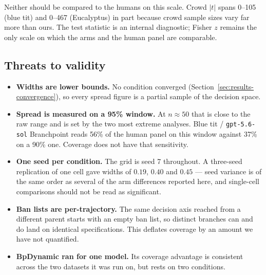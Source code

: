 \documentclass{article}
\begin{document}
Neither should be compared to the humans on this scale. Crowd $|t|$ spans
0--105 (blue tit) and 0--467 (Eucalyptus) in part because crowd sample sizes
vary far more than ours. The test statistic is an internal diagnostic; Fisher
$z$ remains the only scale on which the arms and the human panel are comparable.

\subsection{Threats to validity}
\label{sec:results-threats}

\begin{itemize}
\item \textbf{Widths are lower bounds.} No condition converged
(Section~\ref{sec:results-convergence}), so every spread figure is a partial
sample of the decision space.
\item \textbf{Spread is measured on a 95\% window.} At $n \approx 50$ that is
close to the raw range and is set by the two most extreme analyses. Blue tit /
\texttt{gpt-5.6-sol} Branchpoint reads 56\% of the human panel on this window
against 37\% on a 90\% one. Coverage does not have that sensitivity.
\item \textbf{One seed per condition.} The grid is seed 7 throughout. A
three-seed replication of one cell gave widths of $0.19$, $0.40$ and $0.45$ ---
seed variance is of the same order as several of the arm differences reported
here, and single-cell comparisons should not be read as significant.
\item \textbf{Ban lists are per-trajectory.} The same decision axis reached from
a different parent starts with an empty ban list, so distinct branches can and
do land on identical specifications. This deflates coverage by an amount we have
not quantified.
\item \textbf{BpDynamic ran for one model.} Its coverage advantage is consistent
across the two datasets it was run on, but rests on two conditions.
\end{itemize}
\end{document}
